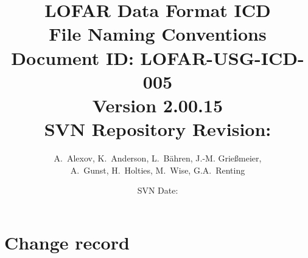 \documentclass[a4paper,10pt,bibtotoc]{scrartcl}
\begin{document}

\title{LOFAR Data Format ICD \\ File Naming Conventions \\
{\normalsize Document ID: LOFAR-USG-ICD-005} \\ 
{\normalsize Version 2.00.15} \\
{\normalsize SVN Repository Revision: \svnInfoMaxRevision}}
\author{A.~Alexov, K.~Anderson, L.~B\"ahren, J.-M. Grie{\ss}meier, \\
  A.~Gunst, H.~Holties, M.~Wise, G.A.~Renting}
\date{\small{SVN Date: \svnInfoMaxToday}}
\maketitle

\tableofcontents
\listoffigures
\listoftables

\clearpage


\section*{Change record}
\end{document}
